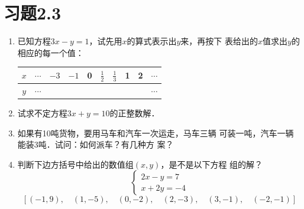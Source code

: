 \section*{习题2.3}
\begin{enumerate}
 \item 已知方程$3x-y=1$，试先用$x$的算式表示出$y$来，再按下
表给出的$x$值求出$y$的相应的每一个值：
\begin{center}
    \renewcommand{\arraystretch}{1.8}
    \begin{tabular}{c|ccccccccc}
   $x$ & $\cdots$ &$-3$&$-1$&0&$\frac{1}{2}$&$\frac{1}{3}$&1&2& $\cdots$\\
   \hline
   $y$ & $\cdots$ &&&&&&&&    $\cdots$\\
    \end{tabular}
\end{center}
    \item 试求不定方程$3x+y=10$的正整数解．
    \item 如果有10吨货物，要用马车和汽车一次运走，马车三辆
可装一吨，汽车一辆能装3吨．试问：如何派车？有几种方
案？
\item 判断下边方括号中给出的数值组$(x, y)$，是不是以下方程
组的解？
 \[\begin{cases}
    2x-y=7\\x+2y=-4
 \end{cases}\]   
\[[(-1,9),\quad  (1,-5),\quad  (0,-2),\quad  (2,-3),\quad  (3,-1),\quad  (-2,-1)] \]


\end{enumerate}
